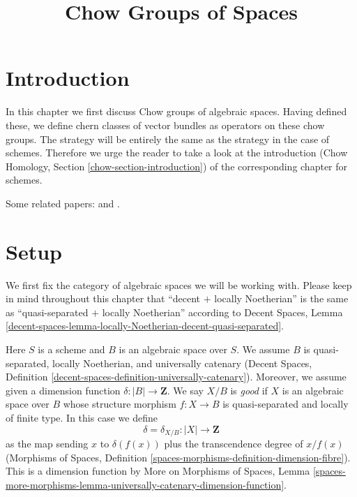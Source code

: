 

%


\title{Chow Groups of Spaces}

\maketitle

\label{section-phantom}


\tableofcontents


\section{Introduction}
\label{section-introduction}

\noindent
In this chapter we first discuss Chow groups of algebraic spaces.
Having defined these, we define chern classes of vector bundles as
operators on these chow groups. The strategy will be entirely
the same as the strategy in the case of schemes. Therefore we
urge the reader to take a look at the introduction
(Chow Homology, Section \ref{chow-section-introduction})
of the corresponding chapter for schemes.

\medskip\noindent
Some related papers: \cite{edidin-graham} and \cite{kresch_cycle}.



\section{Setup}
\label{section-setup}

\noindent
We first fix the category of algebraic spaces we will be working with.
Please keep in mind throughout this chapter that
``decent $+$ locally Noetherian'' is the same as
``quasi-separated $+$ locally Noetherian'' according to
Decent Spaces, Lemma
\ref{decent-spaces-lemma-locally-Noetherian-decent-quasi-separated}.

\begin{situation}
\label{situation-setup}
Here $S$ is a scheme and $B$ is an algebraic space over $S$.
We assume $B$ is quasi-separated, locally Noetherian, and
universally catenary (Decent Spaces, Definition
\ref{decent-spaces-definition-universally-catenary}).
Moreover, we assume given a dimension function
$\delta : |B| \longrightarrow \mathbf{Z}$.
We say $X/B$ is {\it good} if $X$ is an algebraic space
over $B$ whose structure morphism $f : X \to B$ is
quasi-separated and locally of finite type.
In this case we define
$$
\delta = \delta_{X/B} : |X| \longrightarrow \mathbf{Z}
$$
as the map sending $x$ to $\delta(f(x))$ plus the transcendence degree
of $x/f(x)$ (Morphisms of Spaces, Definition
\ref{spaces-morphisms-definition-dimension-fibre}).
This is a dimension function by
More on Morphisms of Spaces, Lemma
\ref{spaces-more-morphisms-lemma-universally-catenary-dimension-function}.
\end{situation}

